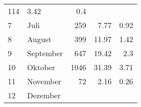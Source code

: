 \begin{longtable}{lXrrr}
       \num{114} &
       \num[round-mode=places,round-precision=2]{3,42} &
         \num[round-mode=places,round-precision=2]{0,4} \\

     7 &
     \multicolumn{1}{X}{ Juli   } &


       \num{259} &
       \num[round-mode=places,round-precision=2]{7,77} &
         \num[round-mode=places,round-precision=2]{0,92} \\

     8 &
     \multicolumn{1}{X}{ August   } &


       \num{399} &
       \num[round-mode=places,round-precision=2]{11,97} &
         \num[round-mode=places,round-precision=2]{1,42} \\

     9 &
     \multicolumn{1}{X}{ September   } &


       \num{647} &
       \num[round-mode=places,round-precision=2]{19,42} &
         \num[round-mode=places,round-precision=2]{2,3} \\

     10 &
     \multicolumn{1}{X}{ Oktober   } &


       \num{1046} &
       \num[round-mode=places,round-precision=2]{31,39} &
         \num[round-mode=places,round-precision=2]{3,71} \\

     11 &
     \multicolumn{1}{X}{ November   } &


       \num{72} &
       \num[round-mode=places,round-precision=2]{2,16} &
         \num[round-mode=places,round-precision=2]{0,26} \\

     12 &
     \multicolumn{1}{X}{ Dezember   } &



\end{longtable}
